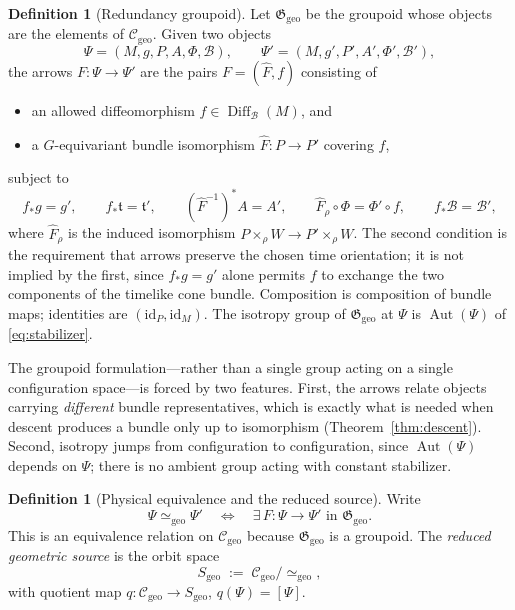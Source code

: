 \documentclass[11pt,a4paper]{article}
\theoremstyle{plain}
\theoremstyle{definition}
\newtheorem{definition}[theorem]{Definition}
\theoremstyle{remark}
\newcommand{\Ggeo}{\mathfrak{G}_{\mathrm{geo}}}
\newcommand{\Cgeo}{\mathcal{C}_{\mathrm{geo}}}
\newcommand{\Sgeo}{S_{\mathrm{geo}}}
\newcommand{\Aut}{\operatorname{Aut}}
\newcommand{\Diff}{\operatorname{Diff}}
\newcommand{\id}{\mathrm{id}}
\begin{document}
\begin{definition}[Redundancy groupoid]
\label{def:groupoid}
Let $\Ggeo$ be the groupoid whose objects are the elements of $\Cgeo$. Given two objects
\[
\Psi=(M,g,P,A,\Phi,\mathcal{B}),
\qquad
\Psi'=(M,g',P',A',\Phi',\mathcal{B}'),
\]
the arrows $F\colon\Psi\to\Psi'$ are the pairs $F=(\hat F,f)$ consisting of
\begin{itemize}[leftmargin=1.6em]
\item an allowed diffeomorphism $f\in\Diff_{\mathcal{B}}(M)$, and
\item a $G$-equivariant bundle isomorphism $\hat F\colon P\to P'$ covering $f$,
\end{itemize}
subject to
\begin{equation}
\label{eq:arrow-conditions}
f_*g=g',
\qquad
f_*\mathfrak{t}=\mathfrak{t}',
\qquad
(\hat F^{-1})^{*}A = A',
\qquad
\hat F_{\rho}\circ\Phi = \Phi'\circ f,
\qquad
f_*\mathcal{B}=\mathcal{B}',
\end{equation}
where $\hat F_\rho$ is the induced isomorphism $P\times_\rho W\to P'\times_\rho W$. The second
condition is the requirement that arrows preserve the chosen time orientation; it is not implied
by the first, since $f_*g=g'$ alone permits $f$ to exchange the two components of the timelike
cone bundle. Composition is composition of bundle maps; identities are $(\id_P,\id_M)$. The
isotropy group of $\Ggeo$ at $\Psi$ is $\Aut(\Psi)$ of \eqref{eq:stabilizer}.
\end{definition}

The groupoid formulation---rather than a single group acting on a single configuration
space---is forced by two features. First, the arrows relate objects carrying \emph{different}
bundle representatives, which is exactly what is needed when descent produces a bundle only up to
isomorphism (Theorem~\ref{thm:descent}). Second, isotropy jumps from configuration to
configuration, since $\Aut(\Psi)$ depends on $\Psi$; there is no ambient group acting with
constant stabilizer.

\begin{definition}[Physical equivalence and the reduced source]
\label{def:sgeo}
Write
\begin{equation}
\label{eq:phys-equiv}
\Psi\simeq_{\mathrm{geo}}\Psi'
\quad\Longleftrightarrow\quad
\exists\,F\colon\Psi\to\Psi' \text{ in } \Ggeo .
\end{equation}
This is an equivalence relation on $\Cgeo$ because $\Ggeo$ is a groupoid. The \emph{reduced
geometric source} is the orbit space
\begin{equation}
\label{eq:sgeo}
\Sgeo \;:=\; \Cgeo/\!\simeq_{\mathrm{geo}} ,
\end{equation}
with quotient map $q\colon\Cgeo\to\Sgeo$, $q(\Psi)=[\Psi]$.
\end{definition}
\end{document}
